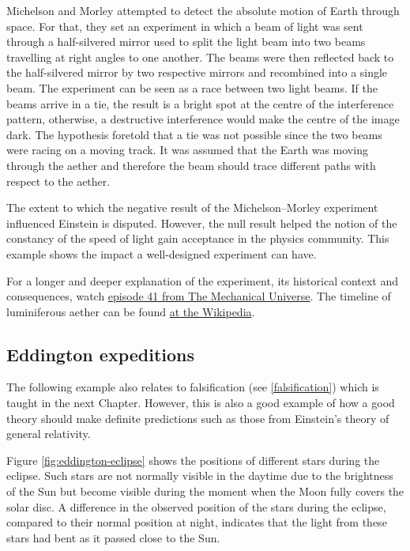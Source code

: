 \documentclass[
]{book}
\begin{document}
Michelson and Morley attempted to detect the absolute motion of Earth through space. For that, they set an experiment in which a beam of light was sent through a half-silvered mirror used to split the light beam into two beams travelling at right angles to one another. The beams were then reflected back to the half-silvered mirror by two respective mirrors and recombined into a single beam. The experiment can be seen as a race between two light beams. If the beams arrive in a tie, the result is a bright spot at the centre of the interference pattern, otherwise, a destructive interference would make the centre of the image dark. The hypothesis foretold that a tie was not possible since the two beams were racing on a moving track. It was assumed that the Earth was moving through the aether and therefore the beam should trace different paths with respect to the aether.

The extent to which the negative result of the Michelson--Morley experiment influenced Einstein is disputed. However, the null result helped the notion of the constancy of the speed of light gain acceptance in the physics community. This example shows the impact a well-designed experiment can have.

For a longer and deeper explanation of the experiment, its historical context and consequences, watch \href{https://www.youtube.com/watch?v=Ip_jdcA8fcw}{episode 41 from The Mechanical Universe}. The timeline of luminiferous aether can be found \href{https://en.wikipedia.org/wiki/Timeline_of_luminiferous_aether}{at the Wikipedia}.

\hypertarget{eddington-expeditions}{%
\subsection{Eddington expeditions}\label{eddington-expeditions}}

The following example also relates to falsification (see \ref{falsification}) which is taught in the next Chapter. However, this is also a good example of how a good theory should make definite predictions such as those from Einstein's theory of general relativity.

Figure \ref{fig:eddington-eclipse} shows the positions of different stars during the eclipse. Such stars are not normally visible in the daytime due to the brightness of the Sun but become visible during the moment when the Moon fully covers the solar disc. A difference in the observed position of the stars during the eclipse, compared to their normal position at night, indicates that the light from these stars had bent as it passed close to the Sun.
\end{document}
